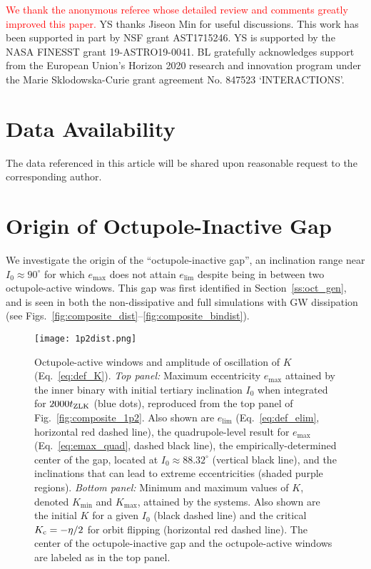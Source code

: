\documentclass[
        fleqn,
        usenatbib,
    ]{mnras}
\begin{document}
\textcolor{red}{We thank the anonymous referee whose detailed review and
comments greatly improved this paper.} YS thanks Jiseon Min for useful
discussions. This work has been supported in part by NSF grant AST1715246. YS is
supported by the NASA FINESST grant 19-ASTRO19-0041. %
BL gratefully acknowledges support from the European Union's Horizon 2020
research and innovation program under the Marie Sklodowska-Curie grant agreement
No. 847523 `INTERACTIONS'.

\section{Data Availability}

The data referenced in this article will be shared upon reasonable request to
the corresponding author.




\clearpage
\onecolumn

\appendix

\section{Origin of Octupole-Inactive Gap}\label{app:gap}

We investigate the origin of the ``octupole-inactive gap'', an
inclination range near $I_0 \approx 90^\circ$ for which $e_{\max}$ does not
attain $e_{\lim}$ despite being in between two octupole-active windows. This gap
was first identified in Section~\ref{ss:oct_gen}, and is seen in both the
non-dissipative and full simulations with GW dissipation (see
Figs.~\ref{fig:composite_dist}--\ref{fig:composite_bindist}).

\begin{figure}
    \centering
    \texttt{[image: 1p2dist.png]}
    \caption{Octupole-active windows and amplitude of oscillation of $K$
    (Eq.~\ref{eq:def_K}). \emph{Top panel:} Maximum eccentricity $e_{\max}$
    attained by the inner binary with initial tertiary inclination $I_0$ when
    integrated for $2000 t_{\rm ZLK}$ (blue dots), reproduced from the top panel
    of Fig.~\ref{fig:composite_1p2}. Also shown are $e_{\lim}$
    (Eq.~\ref{eq:def_elim}, horizontal red dashed line), the quadrupole-level
    result for $e_{\max}$ (Eq.~\ref{eq:emax_quad}, dashed black line), the
    empirically-determined center of the gap, located at $I_0 \approx
    88.32^\circ$ (vertical black line), and the inclinations that can lead to
    extreme eccentricities (shaded purple regions). \emph{Bottom panel:} Minimum and maximum
    values of $K$, denoted $K_{\min}$ and $K_{\max}$, attained by the systems.
    Also shown are the initial $K$ for a given $I_0$ (black dashed line) and the
    critical $K_{\rm c} = -\eta / 2$ for orbit flipping (horizontal red dashed
    line). The center of the octupole-inactive gap and the octupole-active
    windows are labeled as in the top panel.
    }\label{fig:kdist}
\end{figure}
\end{document}
